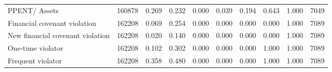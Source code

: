 \begin{table}[ht]
\begin{tabular}{lrrrrrrrrr}
  PPENT/ Assets & 160878 & 0.269 & 0.232 & 0.000 & 0.039 & 0.194 & 0.643 & 1.000 & 7049 \\ 
  Financial covenant violation & 162208 & 0.069 & 0.254 & 0.000 & 0.000 & 0.000 & 0.000 & 1.000 & 7089 \\ 
  New financial covenant violation & 162208 & 0.020 & 0.140 & 0.000 & 0.000 & 0.000 & 0.000 & 1.000 & 7089 \\ 
  One-time violator & 162208 & 0.102 & 0.302 & 0.000 & 0.000 & 0.000 & 1.000 & 1.000 & 7089 \\ 
  Frequent violator & 162208 & 0.358 & 0.480 & 0.000 & 0.000 & 0.000 & 1.000 & 1.000 & 7089 \\ 
   \hline
\end{tabular}
\end{table}
